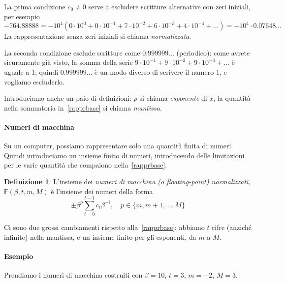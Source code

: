 \documentclass[a4paper]{report}
\theoremstyle{definition}
\newtheorem{definition}[theorem]{Definizione}
\theoremstyle{remark}
\begin{document}
La prima condizione $c_0 \neq 0$ serve a escludere scritture alternative con zeri iniziali, per esempio
\[
-764.88888 = - 10^4 (0 \cdot 10^0 + 0 \cdot 10^{-1} + 7\cdot 10^{-2} + 6\cdot 10^{-3} + 4\cdot 10^{-4} + \dots) = -10^4 \cdot 0.07648\dots
\]
La rappresentazione senza zeri iniziali si chiama \emph{normalizzata}.

La seconda condizione esclude scritture come $0.999999\dots$ (periodico): come avrete sicuramente già visto, la somma della serie $9\cdot 10^{-1}+9\cdot 10^{-2} + 9\cdot 10^{-3}+\dots$ è uguale a 1; quindi $0.999999\dots$ è un modo diverso di scrivere il numero 1, e vogliamo escluderlo.

Introduciamo anche un paio di definizioni: $p$ si chiama \emph{esponente} di $x$, la quantità nella sommatoria in~\eqref{rapprbase} si chiama \emph{mantissa}.

\paragraph{Numeri di macchina}
Su un computer, possiamo rappresentare solo una quantità finita di numeri. Quindi introduciamo un insieme finito di numeri, introducendo delle limitazioni per le varie quantità che compaiono nella~\eqref{rapprbase}.
\begin{definition}
    L'insieme dei \emph{numeri di macchina (o floating-point) normalizzati}, $\mathbb{F}(\beta, t, m, M)$ è l'insieme dei numeri della forma
    \[
        \pm \beta^p \sum_{i=0}^{t-1} c_i \beta^{-i}, \quad p \in \{m, m+1, \dots, M\}  
    \]
\end{definition}
Ci sono due grossi cambiamenti rispetto alla~\eqref{rapprbase}: abbiamo $t$ cifre (anziché infinite) nella mantissa, e un insieme finito per gli esponenti, da $m$ a $M$.

\paragraph{Esempio} Prendiamo i numeri di macchina costruiti con $\beta=10$, $t=3$, $m=-2$, $M=3$.
\end{document}
